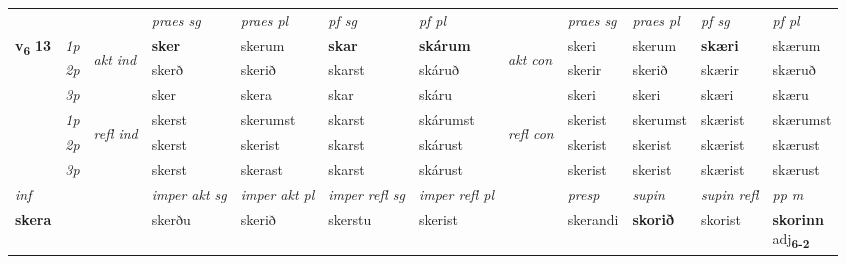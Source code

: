 \begin{longtable}[l]{X>{\footnotesize\itshape}llXXXXlXXXX}
 & &   & \textit{praes sg}  & \textit{praes pl}    & \textit{ pf sg} & \textit{pf pl} & & \textit{praes sg}  & \textit{praes pl}    & \textit{pf sg} & \textit{pf pl }  \\ \cmidrule{4-7} \cmidrule{9-12}
 \multirow{2}{*}{{{\textbf{v{\textsubscript{6}}} \Large{\textbf{13}}}}}  & 1p & \multirow{3}{*}{\begin{turn}{90}\textit{akt ind}\end{turn}} & \textbf{sker} & skerum & \textbf{skar} & \textbf{skárum} & \multirow{3}{*}{\begin{turn}{90}\textit{akt con}\end{turn}} &skeri & skerum & \textbf{skæri} & skærum\\*
 & 2p &  &  skerð  & skerið & skarst & skáruð & & skerir & skerið & skærir & skæruð \\*
 & 3p &  & sker & skera & skar & skáru & & skeri & skeri& skæri & skæru \\*
\cmidrule{4-7} \cmidrule{9-12}
 & 1p & \multirow{3}{*}{\begin{turn}{90}\textit{refl ind}\end{turn}}  & skerst & skerumst & skarst & skárumst & \multirow{3}{*}{\begin{turn}{90}\textit{refl con}\end{turn}}  &skerist & skerumst & skærist & skærumst \\*
 & 2p &  & skerst & skerist & skarst & skárust & &skerist & skerist & skærist & skærust \\*
 & 3p  & & skerst & skerast & skarst & skárust & & skerist & skerist& skærist & skærust \\*
\cmidrule{4-7} \cmidrule{9-12}

   {\textit{inf}} & &  & \textit{imper akt sg} & \textit{imper akt pl} & \textit{imper refl sg} & \textit{imper refl pl} && \textit{presp} & \textit{supin} & \textit{supin refl} & \textit{pp m} \\*
  {\textbf{skera}} & && skerðu  & skerið & skerstu & skerist && skerandi &  \textbf{skorið} & skorist & \specialcell{\textbf{skorinn} \\ adj\textbf{\textsubscript{6-2}}} \\*

\midrule


\end{longtable}
